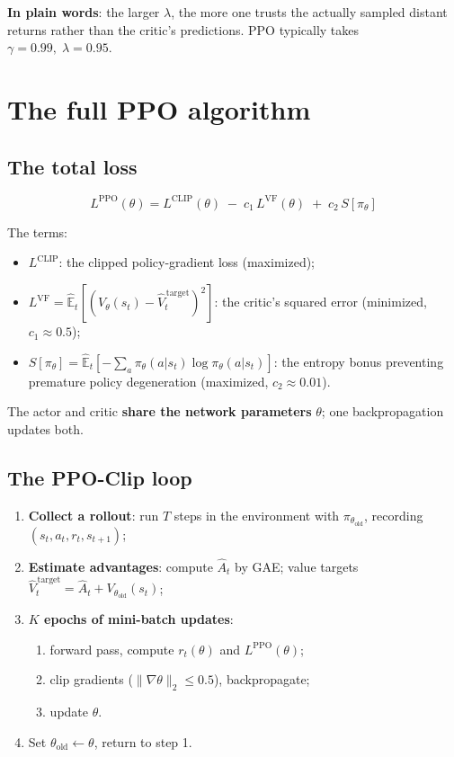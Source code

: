 \documentclass{article}
\begin{document}
\textbf{In plain words}: the larger $\lambda$, the more one trusts the actually sampled distant returns rather than the critic's predictions. PPO typically takes $\gamma = 0.99,\;\lambda = 0.95$.

\section*{The full PPO algorithm}

\subsection*{The total loss}

\[
\boxed{L^{\text{PPO}}(\theta)
  = L^{\text{CLIP}}(\theta)
  \;-\; c_1\,L^{\text{VF}}(\theta)
  \;+\; c_2\,S[\pi_\theta]}
\]

The terms:
\begin{itemize}
  \item $L^{\text{CLIP}}$: the clipped policy-gradient loss (maximized);
  \item $L^{\text{VF}} = \hat{\mathbb{E}}_t\!\left[\left(V_\theta(s_t) - \hat{V}_t^{\,\text{target}}\right)^2\right]$: the critic's squared error (minimized, $c_1 \approx 0.5$);
  \item $S[\pi_\theta] = \hat{\mathbb{E}}_t\!\left[-\sum_a \pi_\theta(a|s_t)\log\pi_\theta(a|s_t)\right]$: the entropy bonus preventing premature policy degeneration (maximized, $c_2 \approx 0.01$).
\end{itemize}

The actor and critic \textbf{share the network parameters} $\theta$; one backpropagation updates both.

\subsection*{The PPO-Clip loop}

\begin{enumerate}
  \item \textbf{Collect a rollout}: run $T$ steps in the environment with $\pi_{\theta_\text{old}}$, recording $(s_t, a_t, r_t, s_{t+1})$;
  \item \textbf{Estimate advantages}: compute $\hat{A}_t$ by GAE; value targets $\hat{V}_t^{\,\text{target}} = \hat{A}_t + V_{\theta_\text{old}}(s_t)$;
  \item \textbf{$K$ epochs of mini-batch updates}:
    \begin{enumerate}
      \item forward pass, compute $r_t(\theta)$ and $L^{\text{PPO}}(\theta)$;
      \item clip gradients ($\|\nabla\theta\|_2 \le 0.5$), backpropagate;
      \item update $\theta$.
    \end{enumerate}
  \item Set $\theta_\text{old} \leftarrow \theta$, return to step 1.
\end{enumerate}
\end{document}
